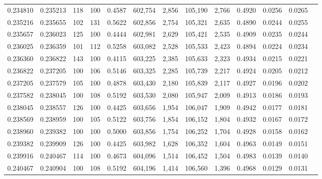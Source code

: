 \begin{tabular}{rrrrrrrrrrrrr}
0.234810 & 0.235213 &   118 & 100 &                                     0.4587 & 602,754 &   2,856 & 105,190 &   2,766 & 0.4920 & 0.0256 & 0.0265 \\
0.235216 & 0.235655 &   102 & 131 &                                     0.5622 & 602,856 &   2,754 & 105,321 &   2,635 & 0.4890 & 0.0244 & 0.0255 \\
0.235657 & 0.236023 &   125 & 100 &                                     0.4444 & 602,981 &   2,629 & 105,421 &   2,535 & 0.4909 & 0.0235 & 0.0244 \\
0.236025 & 0.236359 &   101 & 112 &                                     0.5258 & 603,082 &   2,528 & 105,533 &   2,423 & 0.4894 & 0.0224 & 0.0234 \\
0.236360 & 0.236822 &   143 & 100 &                                     0.4115 & 603,225 &   2,385 & 105,633 &   2,323 & 0.4934 & 0.0215 & 0.0221 \\
0.236822 & 0.237205 &   100 & 106 &                                     0.5146 & 603,325 &   2,285 & 105,739 &   2,217 & 0.4924 & 0.0205 & 0.0212 \\
0.237205 & 0.237579 &   105 & 100 &                                     0.4878 & 603,430 &   2,180 & 105,839 &   2,117 & 0.4927 & 0.0196 & 0.0202 \\
0.237582 & 0.238045 &   100 & 108 &                                     0.5192 & 603,530 &   2,080 & 105,947 &   2,009 & 0.4913 & 0.0186 & 0.0193 \\
0.238045 & 0.238557 &   126 & 100 &                                     0.4425 & 603,656 &   1,954 & 106,047 &   1,909 & 0.4942 & 0.0177 & 0.0181 \\
0.238569 & 0.238959 &   100 & 105 &                                     0.5122 & 603,756 &   1,854 & 106,152 &   1,804 & 0.4932 & 0.0167 & 0.0172 \\
0.238960 & 0.239382 &   100 & 100 &                                     0.5000 & 603,856 &   1,754 & 106,252 &   1,704 & 0.4928 & 0.0158 & 0.0162 \\
0.239382 & 0.239909 &   126 & 100 &                                     0.4425 & 603,982 &   1,628 & 106,352 &   1,604 & 0.4963 & 0.0149 & 0.0151 \\
0.239916 & 0.240467 &   114 & 100 &                                     0.4673 & 604,096 &   1,514 & 106,452 &   1,504 & 0.4983 & 0.0139 & 0.0140 \\
0.240467 & 0.240904 &   100 & 108 &                                     0.5192 & 604,196 &   1,414 & 106,560 &   1,396 & 0.4968 & 0.0129 & 0.0131 \\

\end{tabular}

